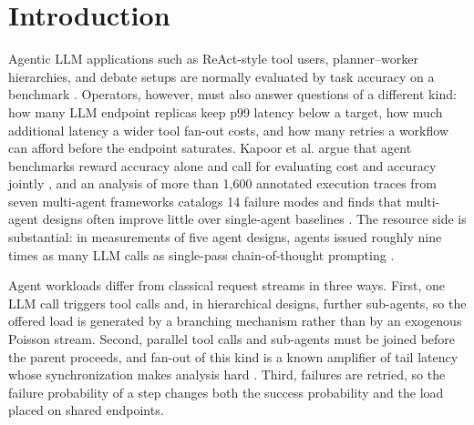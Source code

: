 \documentclass[journal]{IEEEtran}
\begin{document}
\section{Introduction}
Agentic LLM applications such as ReAct-style tool users, planner--worker hierarchies, and debate setups \cite{yao2023react,wu2023autogen,hong2024metagpt,du2023debate} are normally evaluated by task accuracy on a benchmark \cite{jimenez2024swebench,zhou2024webarena,liu2024agentbench}. Operators, however, must also answer questions of a different kind: how many LLM endpoint replicas keep p99 latency below a target, how much additional latency a wider tool fan-out costs, and how many retries a workflow can afford before the endpoint saturates. Kapoor et al. argue that agent benchmarks reward accuracy alone and call for evaluating cost and accuracy jointly \cite{kapoor2024agents}, and an analysis of more than 1{,}600 annotated execution traces from seven multi-agent frameworks catalogs 14 failure modes and finds that multi-agent designs often improve little over single-agent baselines \cite{cemri2025whyfail}. The resource side is substantial: in measurements of five agent designs, agents issued roughly nine times as many LLM calls as single-pass chain-of-thought prompting \cite{kim2025dynamic}.

Agent workloads differ from classical request streams in three ways. First, one LLM call triggers tool calls and, in hierarchical designs, further sub-agents, so the offered load is generated by a branching mechanism rather than by an exogenous Poisson stream. Second, parallel tool calls and sub-agents must be joined before the parent proceeds, and fan-out of this kind is a known amplifier of tail latency \cite{dean2013tail} whose synchronization makes analysis hard \cite{nelson1988forkjoin}. Third, failures are retried, so the failure probability of a step changes both the success probability and the load placed on shared endpoints.
\end{document}
